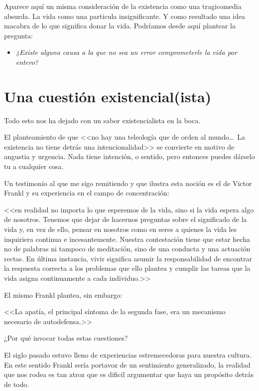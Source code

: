 \documentclass[10pt]{article}
\begin{document}
       Aparece aquí un misma consideración de la existencia como una
       tragicomedia absurda. La vida como una particula insignificante. Y como
       resultado una idea macabra de lo que significa donar la vida. Podríamos
       desde aquí plantear la pregunta:

       \begin{itemize}
       \item \emph{¿Existe alguna causa a la que no sea un error comprometerle
           la vida por entero?}
       \end{itemize}

\section{Una cuestión existencial(ista)}
    Todo esto nos ha dejado con un sabor existencialista en la boca.

    El planteamiento de que <<no hay una teleología que de orden al mundo\ldots ~La
    existencia no tiene detrás una intencionalidad>> se convierte en motivo de
    angustia y urgencia. Nada tiene intención, o sentido, pero entonces puedes
    dárselo tu a cualquier cosa.

    Un testimonio al que me sigo remitiendo y que ilustra esta noción es el de
    Victor Frankl y su experiencia en el campo de concentración: 

    <<en realidad no importa lo que esperemos de la vida, sino si la vida
    espera algo de nosotros. Tenemos que dejar de hacernos preguntas sobre el
    significado de la vida y, en vez de ello, pensar en nosotros como en seres
    a quienes la vida les inquiriera continua e incesantemente. Nuestra
    contestación tiene que estar hecha no de palabras ni tampoco de
    meditación, sino de una conducta y una actuación rectas. En última
    instancia, vivir significa asumir la responsabilidad de encontrar la
    respuesta correcta a los problemas que ello plantea y cumplir las tareas
    que la vida asigna continuamente a cada individuo.>>

    El mismo Frankl plantea, sin embargo:

    <<La apatía, el principal síntoma de la segunda fase, era un mecanismo
    necesario de autodefensa.>>

¿Por qué invocar todas estas cuestiones?

El siglo pasado estuvo lleno de experiencias estremecedoras para nuestra
cultura. En este sentido Frankl sería portavoz de un sentimiento generalizado,
la realidad que nos rodea es tan atroz que es dificil argumentar que haya un
propósito detrás de todo.
\end{document}
